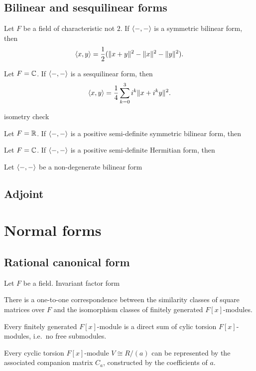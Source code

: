 \documentclass{../../large}
\begin{document}
\section{Bilinear and sesquilinear forms}

\begin{prb}
\begin{parts}
\item Let $F$ be a field of characteristic not $2$. If $\langle-,-\rangle$ is a symmetric bilinear form, then
\[\langle x,y\rangle=\frac12(\|x+y\|^2-\|x\|^2-\|y\|^2).\]
\item Let $F=\mathbb{C}$. If $\langle-,-\rangle$ is a sesquilinear form, then
\[\langle x,y\rangle=\frac14\sum_{k=0}^3i^k\|x+i^ky\|^2.\]
\item isometry check
\end{parts}
\end{prb}

\begin{prb}
\begin{parts}
\item Let $F=\mathbb{R}$. If $\langle-,-\rangle$ is a positive semi-definite symmetric bilinear form, then
\item Let $F=\mathbb{C}$. If $\langle-,-\rangle$ is a positive semi-definite Hermitian form, then
\end{parts}
\end{prb}

\begin{prb}
Let $\langle-,-\rangle$ be a non-degenerate bilinear form
\end{prb}


\section{Adjoint}
\begin{prb}
\end{prb}








\chapter{Normal forms}
\section{Rational canonical form}
\begin{prb}
Let $F$ be a field.
Invariant factor form
\begin{parts}
\item There is a one-to-one correspondence between the similarity classes of square matrices over $F$ and the isomorphism classes of finitely generated $F[x]$-modules.
\item Every finitely generated $F[x]$-module is a direct sum of cylic torsion $F[x]$-modules, i.e.~no free submodules.
\item Every cyclic torsion $F[x]$-module $V\cong R/(a)$ can be represented by the associated companion matrix $C_a$, constructed by the coefficients of $a$.
\end{parts}
\end{prb}
\end{document}
